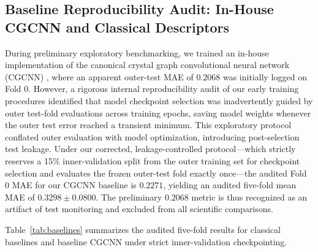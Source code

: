 \documentclass[final,3p,times]{elsarticle}
\begin{document}
\subsection{Baseline Reproducibility Audit: In-House CGCNN and Classical Descriptors}
During preliminary exploratory benchmarking, we trained an in-house implementation of the canonical crystal graph convolutional neural network (CGCNN) \cite{xie2018crystal}, where an apparent outer-test MAE of $0.2068$ was initially logged on Fold 0. However, a rigorous internal reproducibility audit of our early training procedures identified that model checkpoint selection was inadvertently guided by outer test-fold evaluations across training epochs, saving model weights whenever the outer test error reached a transient minimum. This exploratory protocol conflated outer evaluation with model optimization, introducing post-selection test leakage. Under our corrected, leakage-controlled protocol---which strictly reserves a 15\% inner-validation split from the outer training set for checkpoint selection and evaluates the frozen outer-test fold exactly once---the audited Fold 0 MAE for our CGCNN baseline is $0.2271$, yielding an audited five-fold mean MAE of $0.3298 \pm 0.0800$. The preliminary $0.2068$ metric is thus recognized as an artifact of test monitoring and excluded from all scientific comparisons.

Table~\ref{tab:baselines} summarizes the audited five-fold results for classical baselines and baseline CGCNN under strict inner-validation checkpointing.
\end{document}

